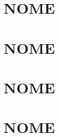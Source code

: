 \documentclass[12pt]{article}
\begin{document}
\section{NOME}
\large



\section{NOME}
\large



\section{NOME}
\large



\section{NOME}
\large
\end{document}
